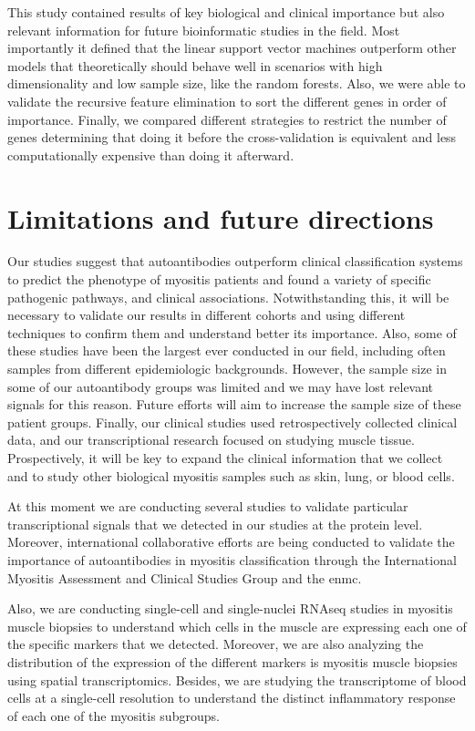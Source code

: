 This study contained results of key biological and clinical importance but also relevant information for future bioinformatic studies in the field. Most importantly it defined that the linear support vector machines outperform other models that theoretically should behave well in scenarios with high dimensionality and low sample size, like the random forests. Also, we were able to validate the recursive feature elimination to sort the different genes in order of importance. Finally, we compared different strategies to restrict the number of genes determining that doing it before the cross-validation is equivalent and less computationally expensive than doing it afterward.

\section{Limitations and future directions}
Our studies suggest that autoantibodies outperform clinical classification systems to predict the phenotype of myositis patients and found a variety of specific pathogenic pathways, and clinical associations. Notwithstanding this, it will be necessary to validate our results in different cohorts and using different techniques to confirm them and understand better its importance. Also, some of these studies have been the largest ever conducted in our field, including often samples from different epidemiologic backgrounds. However, the sample size in some of our autoantibody groups was limited and we may have lost relevant signals for this reason. Future efforts will aim to increase the sample size of these patient groups. Finally, our clinical studies used retrospectively collected clinical data, and our transcriptional research focused on studying muscle tissue. Prospectively, it will be key to expand the clinical information that we collect and to study other biological myositis samples such as skin, lung, or blood cells.

At this moment we are conducting several studies to validate particular transcriptional signals that we detected in our studies at the protein level. Moreover, international collaborative efforts are being conducted to validate the importance of autoantibodies in myositis classification through the International Myositis Assessment and Clinical Studies Group and the \gls{enmc}.

Also, we are conducting single-cell and single-nuclei RNAseq studies in myositis muscle biopsies to understand which cells in the muscle are expressing each one of the specific markers that we detected. Moreover, we are also analyzing the distribution of the expression of the different markers is myositis muscle biopsies using spatial transcriptomics. Besides, we are studying the transcriptome of blood cells at a single-cell resolution to understand the distinct inflammatory response of each one of the myositis subgroups.

